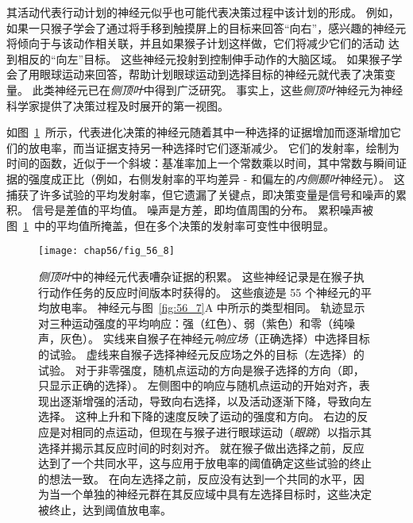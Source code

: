 其活动代表行动计划的神经元似乎也可能代表决策过程中该计划的形成。
例如，如果一只猴子学会了通过将手移到触摸屏上的目标来回答“向右”，感兴趣的神经元将倾向于与该动作相关联，并且如果猴子计划这样做，它们将减少它们的活动 达到相反的“向左”目标。
这些神经元投射到控制伸手动作的大脑区域。 如果猴子学会了用眼球运动来回答，帮助计划眼球运动到选择目标的神经元就代表了决策变量。
此类神经元已在\textit{侧顶叶}中得到广泛研究。
事实上，这些\textit{侧顶叶}神经元为神经科学家提供了决策过程及时展开的第一视图。


如图~\ref{fig:56_8}~所示，代表进化决策的神经元随着其中一种选择的证据增加而逐渐增加它们的放电率，而当证据支持另一种选择时它们逐渐减少。
它们的发射率，绘制为时间的函数，近似于一个斜坡：基准率加上一个常数乘以时间，其中常数与瞬间证据的强度成正比（例如，右侧发射率的平均差异 - 和偏左的\textit{内侧颞叶}神经元）。
这捕获了许多试验的平均发射率，但它遗漏了关键点，即决策变量是信号和噪声的累积。
信号是差值的平均值。 噪声是方差，即均值周围的分布。
累积噪声被图~\ref{fig:56_8}~中的平均值所掩盖，但在多个决策的发射率可变性中很明显。


\begin{figure}[htbp]
	\centering
	\texttt{[image: chap56/fig\_56\_8]}
	\caption{\textit{侧顶叶}中的神经元代表嘈杂证据的积累。
		这些神经记录是在猴子执行动作任务的反应时间版本时获得的。
		这些痕迹是 55 个神经元的平均放电率。
		神经元与图~\ref{fig:56_7}A 中所示的类型相同。
		轨迹显示对三种运动强度的平均响应：强（红色）、弱（紫色）和零（纯噪声，灰色）。
		实线来自猴子在神经元\textit{响应场}（正确选择）中选择目标的试验。
		虚线来自猴子选择神经元反应场之外的目标（左选择）的试验。
		对于非零强度，随机点运动的方向是猴子选择的方向（即，只显示正确的选择）。
		左侧图中的响应与随机点运动的开始对齐，表现出逐渐增强的活动，导致向右选择，以及活动逐渐下降，导致向左选择。
		这种上升和下降的速度反映了运动的强度和方向。
		右边的反应是对相同的点运动，但现在与猴子进行眼球运动（\textit{眼跳}）以指示其选择并揭示其反应时间的时刻对齐。
		就在猴子做出选择之前，反应达到了一个共同水平，这与应用于放电率的阈值确定这些试验的终止的想法一致。
		在向左选择之前，反应没有达到一个共同的水平，因为当一个单独的神经元群在其反应域中具有左选择目标时，这些决定被终止，达到阈值放电率\cite{roitman2002response}。}
	\label{fig:56_8}
\end{figure}


